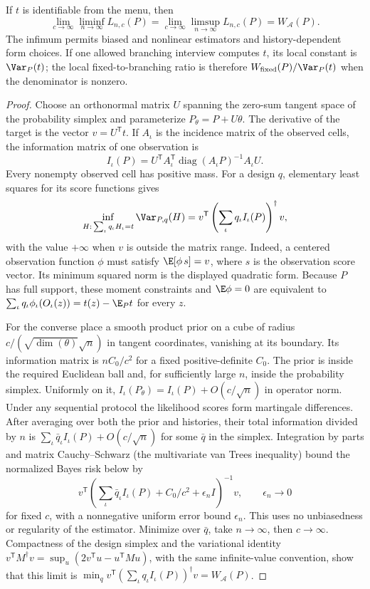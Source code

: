 \begin{proposition}\label{prop:local}
If $t$ is identifiable from the menu, then
\[
 \lim_{c\to\infty}\liminf_{n\to\infty}L_{n,c}(P)
 =\lim_{c\to\infty}\limsup_{n\to\infty}L_{n,c}(P)
 =W_{\mathcal A}(P).
\]
The infimum permits biased and nonlinear estimators and history-dependent
form choices. If one allowed branching interview computes $t$, its local
constant is $\Var_P(t)$; the local fixed-to-branching ratio is therefore
$W_{\rm fixed}(P)/\Var_P(t)$ when the denominator is nonzero.
\end{proposition}
\begin{proof}
Choose an orthonormal matrix $U$ spanning the zero-sum tangent space of the
probability simplex and parameterize $P_\theta=P+U\theta$. The derivative of
the target is the vector $v=U^{\mathsf T}t$. If $A_\iota$ is the incidence matrix
of the observed cells, the information matrix of one observation is
\[
 I_\iota(P)=U^{\mathsf T}A_\iota^{\mathsf T}
           \operatorname{diag}(A_\iota P)^{-1}A_\iota U.
\]
Every nonempty observed cell has positive mass. For a design $q$, elementary
least squares for its score functions gives
\[
 \inf_{H:\,\sum_\iota q_\iota H_\iota=t}\Var_{P,q}(H)
     =v^{\mathsf T}\left(\sum_\iota q_\iota I_\iota(P)\right)^\dagger v,
\]
with the value $+\infty$ when $v$ is outside the matrix range.
Indeed, a centered observation function $\phi$ must satisfy
$\E[\phi\,s]=v$, where $s$ is the observation score vector. Its
minimum squared norm is the displayed quadratic form. Because $P$ has full
support, these moment constraints and $\E\phi=0$ are equivalent to
$\sum_\iota q_\iota\phi_\iota(O_\iota(z))=t(z)-\E_Pt$ for every $z$.

For the converse place a smooth product prior on a cube of radius
$c/(\sqrt{\dim(\theta)}\sqrt n)$ in tangent coordinates, vanishing at its
boundary. Its information matrix is $nC_0/c^2$ for a fixed positive-definite
$C_0$. The prior is inside the required Euclidean ball and, for sufficiently
large $n$, inside the probability simplex. Uniformly on it,
$I_\iota(P_\theta)=I_\iota(P)+O(c/\sqrt n)$ in operator norm. Under any sequential
protocol the likelihood scores form martingale differences. After averaging
over both the prior and histories, their total information divided by $n$
is $\sum_\iota\bar q_\iota I_\iota(P)+O(c/\sqrt n)$ for some $\bar q$ in the simplex.
Integration by parts and matrix Cauchy--Schwarz (the multivariate van Trees
inequality) bound the normalized Bayes risk below by
\[
 v^{\mathsf T}\left(\sum_\iota\bar q_\iota I_\iota(P)+C_0/c^2+
                 \epsilon_n I\right)^{-1}v,
 \qquad \epsilon_n\to0
\]
for fixed $c$, with a nonnegative uniform error bound $\epsilon_n$.
This uses no unbiasedness or regularity of the estimator.
Minimize over $\bar q$, take $n\to\infty$, then $c\to\infty$.
Compactness of the design simplex and the variational identity
$v^{\mathsf T}M^\dagger v=\sup_u(2v^{\mathsf T}u-u^{\mathsf T}Mu)$,
with the same infinite-value convention, show that this limit is
$\min_qv^{\mathsf T}(\sum_\iota q_\iota I_\iota(P))^\dagger v=W_{\mathcal A}(P)$.


\end{proof}
